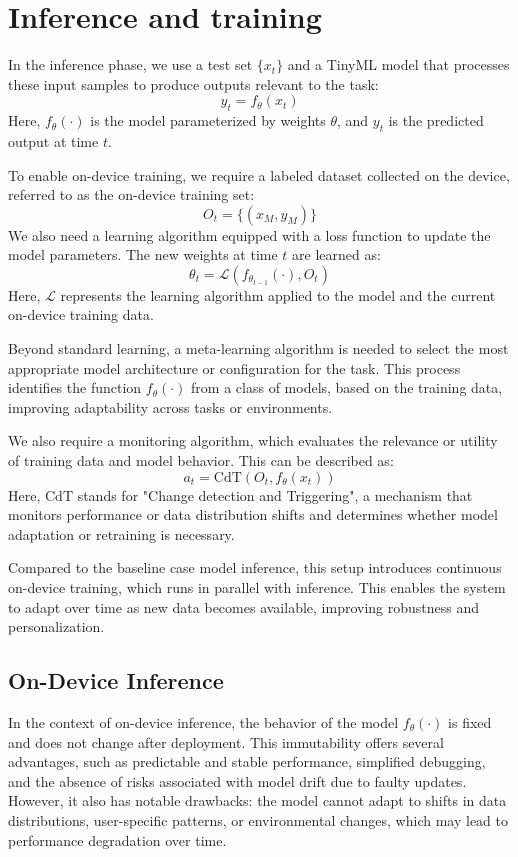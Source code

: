 \section{Inference and training}

In the inference phase, we use a test set $\{x_t\}$ and a TinyML model that processes these input samples to produce outputs relevant to the task:
\[y_t=f_{\theta}(x_t)\]
\noindent Here, $f_{\theta}(\cdot)$ is the model parameterized by weights $\theta$, and $y_t$ is the predicted output at time $t$.

To enable on-device training, we require a labeled dataset collected on the device, referred to as the on-device training set:
\[O_t=\{(x_M,y_M)\}\]
We also need a learning algorithm equipped with a loss function to update the model parameters. 
The new weights at time $t$ are learned as:
\[\theta_t=\mathcal{L}(f_{\theta_{t-1}}(\cdot),O_t)\] 
\noindent Here, $\mathcal{L}$ represents the learning algorithm applied to the model and the current on-device training data.

Beyond standard learning, a meta-learning algorithm is needed to select the most appropriate model architecture or configuration for the task. 
This process identifies the function $f_\theta(\cdot)$ from a class of models, based on the training data, improving adaptability across tasks or environments.

We also require a monitoring algorithm, which evaluates the relevance or utility of training data and model behavior. 
This can be described as:
\[a_t=\text{CdT}(O_t,f_\theta(x_t))\]
\noindent Here, $\text{CdT}$ stands for "Change detection and Triggering", a mechanism that monitors performance or data distribution shifts and determines whether model adaptation or retraining is necessary.

Compared to the baseline case model inference, this setup introduces continuous on-device training, which runs in parallel with inference. 
This enables the system to adapt over time as new data becomes available, improving robustness and personalization.

\subsection{On-Device Inference}
In the context of on-device inference, the behavior of the model $f_\theta(\cdot)$ is fixed and does not change after deployment. 
This immutability offers several advantages, such as predictable and stable performance, simplified debugging, and the absence of risks associated with model drift due to faulty updates. 
However, it also has notable drawbacks: the model cannot adapt to shifts in data distributions, user-specific patterns, or environmental changes, which may lead to performance degradation over time.


